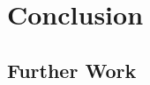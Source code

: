 \documentclass[final,rdr32.tex]{subfiles}
\begin{document}
\chapter{Conclusion}


\section{Further Work}
\end{document}
